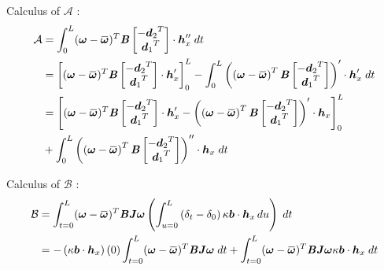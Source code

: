 Calculus of $\mathcal{A}$ :
\begin{equation}
	\begin{split}
	\mathcal{A} 
	& = \int_{0}^{L} (\vect{\omega} - \overbar{\vect{\omega}})^T \mat{B} 
		\begin{bmatrix}
			-{\vect{d}_2}^T\\
			{\vect{d}_1}^T\\
		\end{bmatrix}\cdot \vect{h}_x'' \;dt \\
	& = \left[(\vect{\omega} - \overbar{\vect{\omega}})^T \mat{B} 
		\begin{bmatrix}
			-{\vect{d}_2}^T\\
			{\vect{d}_1}^T\\
		\end{bmatrix} \cdot \vect{h}_x'\right]_0^L
		- \int_{0}^{L} \left(\left(\vect{\omega} - \overbar{\vect{\omega}}\right)^T \mat{B} 
		\begin{bmatrix}
			-{\vect{d}_2}^T\\
			{\vect{d}_1}^T\\
		\end{bmatrix}\right)'\cdot \vect{h}_x' \;dt \\
	& = \left[(\vect{\omega} - \overbar{\vect{\omega}})^T \mat{B} 
		\begin{bmatrix}
			-{\vect{d}_2}^T\\
			{\vect{d}_1}^T\\
		\end{bmatrix} \cdot \vect{h}_x'
		- \left(\left(\vect{\omega} - \overbar{\vect{\omega}}\right)^T \mat{B} 
		\begin{bmatrix}
			-{\vect{d}_2}^T\\
			{\vect{d}_1}^T\\
		\end{bmatrix}\right)'\cdot \vect{h}_x
		\right]_0^L\\
		&+ \int_{0}^{L} \left(\left(\vect{\omega} - \overbar{\vect{\omega}}\right)^T \mat{B} 
		\begin{bmatrix}
			-{\vect{d}_2}^T\\
			{\vect{d}_1}^T\\
		\end{bmatrix}\right)''\cdot \vect{h}_x \;dt \\
	\end{split}
\end{equation}

Calculus of $\mathcal{B}$ :
\begin{equation}
	\begin{aligned}
	\mathcal{B} &=
	\int_{t=0}^{L} (\vect{\omega} - \overbar{\vect{\omega}})^T \mat{B}\mat{J}\vect{\omega}
	\left(\int_{u=0}^L \left(\delta_t-\delta_0\right)\kappa\vect{b}\cdot  \vect{h}_x \,du\right)
	\;dt
	\\
	&=
	-\left(\kappa\vect{b}\cdot\vect{h}_x\right)(0) \int_{t=0}^{L} (\vect{\omega} - \overbar{\vect{\omega}})^T \mat{B}\mat{J}\vect{\omega}\;dt
	+
	\int_{t=0}^{L} (\vect{\omega} - \overbar{\vect{\omega}})^T \mat{B}\mat{J}\vect{\omega}
	\kappa\vect{b}\cdot\vect{h}_x 
	\;dt
	\end{aligned} 
\end{equation}

